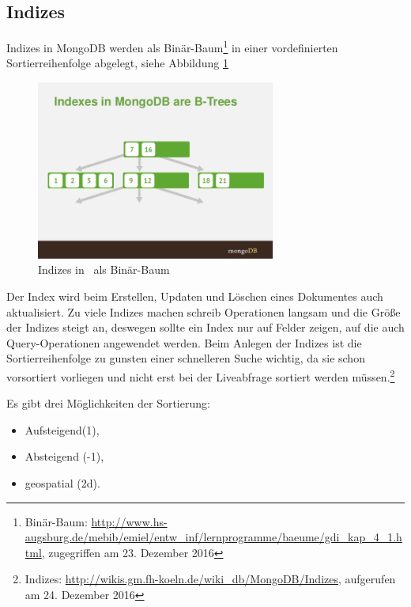 \subsection{Indizes}
Indizes in MongoDB werden als Binär-Baum\footnote{Binär-Baum: \url{http://www.hs-augsburg.de/mebib/emiel/entw_inf/lernprogramme/baeume/gdi_kap_4_1.html}, zugegriffen am 23. Dezember 2016} in einer vordefinierten Sortierreihenfolge abgelegt, siehe Abbildung \ref{img:IndexesInMongoDBAreB-Trees}
\begin{figure}[H]
\centering
	\includegraphics[width=0.7\textwidth]{resources/indexingBtree}
\caption[Indizes in \mongo\ als Binär-Baum]{Indizes in \mongo\ als Binär-Baum\protect\footnotemark}
\label{img:IndexesInMongoDBAreB-Trees}
\end{figure}

Der Index wird beim Erstellen, Updaten und Löschen eines Dokumentes auch aktualisiert. Zu viele Indizes machen schreib Operationen langsam und die Größe der Indizes steigt an, deswegen sollte ein Index nur auf Felder zeigen, auf die auch Query-Operationen angewendet werden. Beim Anlegen der Indizes ist die Sortierreihenfolge zu gunsten einer schnelleren Suche wichtig, da sie schon vorsortiert vorliegen und nicht erst bei der Liveabfrage sortiert werden müssen.\footnote{Indizes: \url{http://wikis.gm.fh-koeln.de/wiki_db/MongoDB/Indizes}, aufgerufen am 24. Dezember 2016}

Es gibt drei Möglichkeiten der Sortierung:

\begin{itemize}
\item Aufsteigend(1),
\item Absteigend (-1),
\item geospatial (2d).
\end{itemize}

